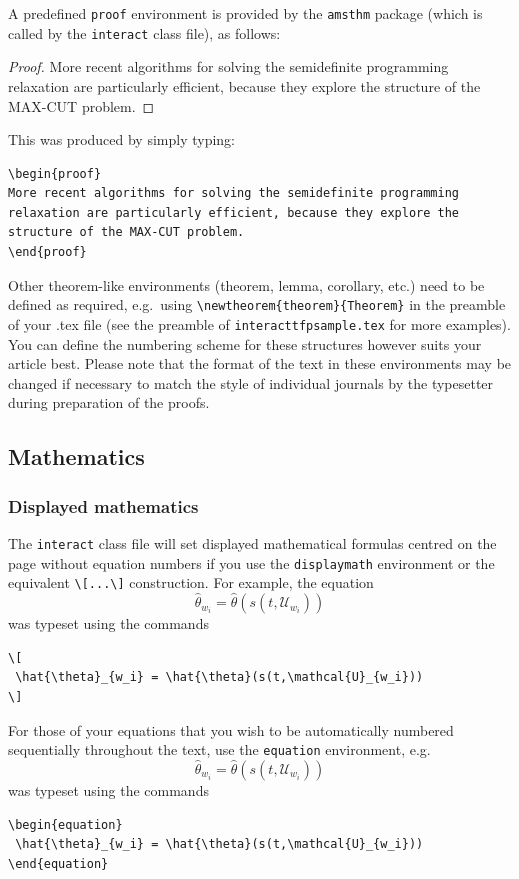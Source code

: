 \documentclass[]{interact}
\theoremstyle{plain}%
\theoremstyle{definition}
\theoremstyle{remark}
\begin{document}
A predefined \verb"proof" environment is provided by the \texttt{amsthm} package (which is called by the \texttt{interact} class file), as follows:
\begin{proof}
More recent algorithms for solving the semidefinite programming relaxation are particularly efficient, because they explore the structure of the MAX-CUT problem.
\end{proof}
\noindent This was produced by simply typing:
\begin{verbatim}
\begin{proof}
More recent algorithms for solving the semidefinite programming
relaxation are particularly efficient, because they explore the
structure of the MAX-CUT problem.
\end{proof}
\end{verbatim}
Other theorem-like environments (theorem, lemma, corollary, etc.) need to be defined as required, e.g.\ using \verb"\newtheorem{theorem}{Theorem}" in the preamble of your .tex file (see the preamble of \verb"interacttfpsample.tex" for more examples). You can define the numbering scheme for these structures however suits your article best. Please note that the format of the text in these environments may be changed if necessary to match the style of individual journals by the typesetter during preparation of the proofs.


\subsection{Mathematics}

\subsubsection{Displayed mathematics}

The \texttt{interact} class file will set displayed mathematical formulas centred on the page without equation numbers if you use the \texttt{displaymath} environment or the equivalent \verb"\[...\]" construction. For example, the equation
\[
 \hat{\theta}_{w_i} = \hat{\theta}(s(t,\mathcal{U}_{w_i}))
\]
was typeset using the commands
\begin{verbatim}
\[
 \hat{\theta}_{w_i} = \hat{\theta}(s(t,\mathcal{U}_{w_i}))
\]
\end{verbatim}

For those of your equations that you wish to be automatically numbered sequentially throughout the text, use the \texttt{equation} environment, e.g.
\begin{equation}
 \hat{\theta}_{w_i} = \hat{\theta}(s(t,\mathcal{U}_{w_i}))
\end{equation}
was typeset using the commands
\begin{verbatim}
\begin{equation}
 \hat{\theta}_{w_i} = \hat{\theta}(s(t,\mathcal{U}_{w_i}))
\end{equation}
\end{verbatim}
\end{document}
